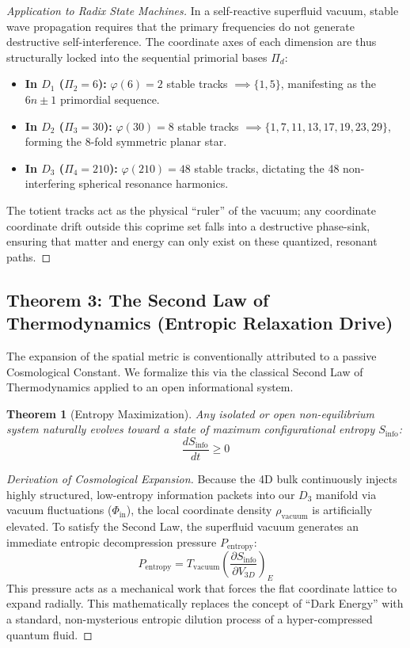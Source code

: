 \documentclass[11pt,a4paper]{article}
\theoremstyle{plain}
\newtheorem{theorem}{Theorem}[section] %
\theoremstyle{definition}
\theoremstyle{remark}
\begin{document}
\begin{proof}[Application to Radix State Machines]
In a self-reactive superfluid vacuum, stable wave propagation requires that the primary frequencies do not generate destructive self-interference. The coordinate axes of each dimension are thus structurally locked into the sequential primorial bases $\Pi_d$:
\begin{itemize}
    \item \textbf{In $D_1$ ($\Pi_2 = 6$):} $\varphi(6) = 2$ stable tracks $\implies \{1, 5\}$, manifesting as the $6n \pm 1$ primordial sequence.
    \item \textbf{In $D_2$ ($\Pi_3 = 30$):} $\varphi(30) = 8$ stable tracks $\implies \{1, 7, 11, 13, 17, 19, 23, 29\}$, forming the 8-fold symmetric planar star.
    \item \textbf{In $D_3$ ($\Pi_4 = 210$):} $\varphi(210) = 48$ stable tracks, dictating the 48 non-interfering spherical resonance harmonics.
\end{itemize}
The totient tracks act as the physical ``ruler'' of the vacuum; any coordinate coordinate drift outside this coprime set falls into a destructive phase-sink, ensuring that matter and energy can only exist on these quantized, resonant paths.
\end{proof}

\subsection{Theorem 3: The Second Law of Thermodynamics (Entropic Relaxation Drive)}
The expansion of the spatial metric is conventionally attributed to a passive Cosmological Constant. We formalize this via the classical Second Law of Thermodynamics applied to an open informational system.

\begin{theorem}[Entropy Maximization]
Any isolated or open non-equilibrium system naturally evolves toward a state of maximum configurational entropy $S_{\text{info}}$:
\begin{equation}
\frac{dS_{\text{info}}}{dt} \ge 0
\end{equation}
\end{theorem}

\begin{proof}[Derivation of Cosmological Expansion]
Because the 4D bulk continuously injects highly structured, low-entropy information packets into our $D_3$ manifold via vacuum fluctuations ($\Phi_{\text{in}}$), the local coordinate density $\rho_{\text{vacuum}}$ is artificially elevated. To satisfy the Second Law, the superfluid vacuum generates an immediate entropic decompression pressure $P_{\text{entropy}}$:
\begin{equation}
P_{\text{entropy}} = T_{\text{vacuum}} \left( \frac{\partial S_{\text{info}}}{\partial V_{3D}} \right)_{E}
\end{equation}
This pressure acts as a mechanical work that forces the flat coordinate lattice to expand radially. This mathematically replaces the concept of ``Dark Energy'' with a standard, non-mysterious entropic dilution process of a hyper-compressed quantum fluid.
\end{proof}
\end{document}
